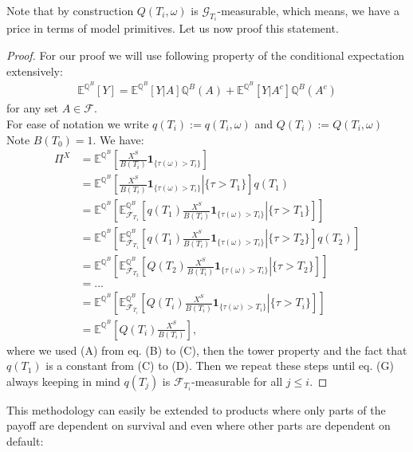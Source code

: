 \documentclass[12pt]{article}
\begin{document}
	Note that by construction $Q(T_i, \omega)$ is $\mathcal{G}_{T_i}$-measurable, which means, we have a price in terms of model primitives. Let us now proof this statement.
	\begin{proof} 
		For our proof we will use following property of the conditional expectation extensively:
		\begin{align*}
			\mathbb{E}^{\mathbb{Q}^B}\left[Y\right] = \mathbb{E}^{\mathbb{Q}^B}\left[Y | A\right]\mathbb{Q}^B(A) + \mathbb{E}^{\mathbb{Q}^B}\left[Y | A^c\right]\mathbb{Q}^B(A^c) \tag{A}
		\end{align*}
		for any set $A \in \mathcal{F}$.\\
		For ease of notation we write $q(T_i):= q(T_i, \omega)$ and $Q(T_i):= Q(T_i, \omega)$ Note $B(T_0) = 1$. We have:
		\begin{align*}
			\Pi^X &=  \mathbb{E}^{\mathbb{Q}^B}\left[\frac{X^S}{B(T_i)} \mathbf{1}_{\{\tau(\omega) > T_i\}} \right]\tag{B}\\
			&=
			\mathbb{E}^{\mathbb{Q}^B}\left[\left.\frac{X^S}{B(T_i)} \mathbf{1}_{\{\tau(\omega) > T_i\}} \right| \{\tau > T_1\} \right]q(T_1) \tag{C}\\
			&=
			\mathbb{E}^{\mathbb{Q}^B}\left[\mathbb{E}^{\mathbb{Q}^B}_{\mathcal{F}_{T_1}}\left[\left.q(T_1)\frac{X^S}{B(T_i)} \mathbf{1}_{\{\tau(\omega) > T_i\}} \right| \{\tau > T_1\}\right] \right]\tag{D}\\
			&=
			\mathbb{E}^{\mathbb{Q}^B}\left[\mathbb{E}^{\mathbb{Q}^B}_{\mathcal{F}_{T_1}}\left[\left.q(T_1)\frac{X^S}{B(T_i)} \mathbf{1}_{\{\tau(\omega) > T_i\}} \right| \{\tau > T_2\}\right] q(T_2)\right]\tag{E}\\
			&=\mathbb{E}^{\mathbb{Q}^B}\left[\mathbb{E}^{\mathbb{Q}^B}_{\mathcal{F}_{T_2}}\left[\left.Q(T_2)\frac{X^S}{B(T_i)} \mathbf{1}_{\{\tau(\omega) > T_i\}} \right| \{\tau > T_2\}\right] \right]\tag{F}\\
			&=...\\
			&= \mathbb{E}^{\mathbb{Q}^B}\left[\mathbb{E}^{\mathbb{Q}^B}_{\mathcal{F}_{T_i}}\left[\left.Q(T_i)\frac{X^S}{B(T_i)} \mathbf{1}_{\{\tau(\omega) > T_i\}} \right| \{\tau > T_i\}\right] \right] \tag{G}\\
			&= \mathbb{E}^{\mathbb{Q}^B}\left[Q(T_i)\frac{X^S}{B(T_i)}\right],
		\end{align*}
		where we used (A) from eq. (B) to (C), then the tower property and the fact that $q(T_1)$ is a constant from (C) to (D). Then we repeat these steps until eq. (G) always keeping in mind $q(T_j)$ is $\mathcal{F}_{T_i}$-measurable for all $j \le i$.
	\end{proof}
	This methodology can easily be extended to products where only parts of the payoff are dependent on survival and even where other parts are dependent on default:
	
\end{document}
